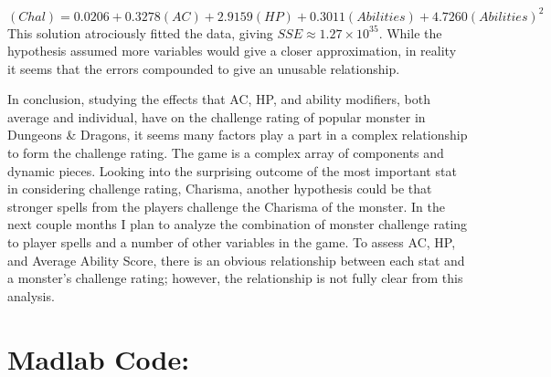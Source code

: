 \documentclass{article}
\begin{document}
$$(Chal) = 0.0206 + 0.3278(AC) + 2.9159(HP) + 0.3011(Abilities) + 4.7260(Abilities)^2$$
This solution atrociously fitted the data, giving $SSE \approx 1.27\times 10^{35}$. While the hypothesis assumed more variables would give a closer approximation, in reality it seems that the errors compounded to give an unusable relationship.
\par In conclusion, studying the effects that AC, HP, and ability modifiers, both average and individual, have on the challenge rating of popular monster in Dungeons \& Dragons, it seems many factors play a part in a complex relationship to form the challenge rating. The game is a complex array of components and dynamic pieces. Looking into the surprising outcome of the most important stat in considering challenge rating, Charisma, another hypothesis could be that stronger spells from the players challenge the Charisma of the monster. In the next couple months I plan to analyze the combination of monster challenge rating to player spells and a number of other variables in the game. To assess AC, HP, and Average Ability Score, there is an obvious relationship between each stat and a monster's challenge rating; however, the relationship is not fully clear from this analysis.
\newpage
\section{Madlab Code:}
\begin{alltt}

\end{alltt}
\end{document}
